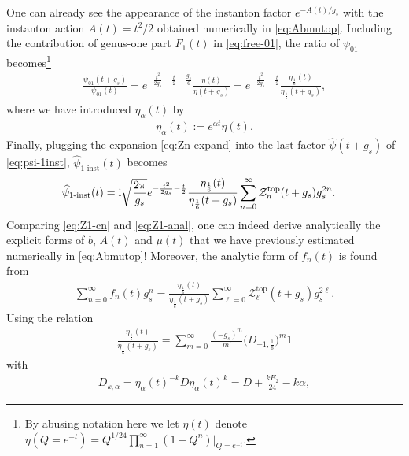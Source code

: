 \documentclass[11pt]{article}
\newcommand{\ri}{{\rm i}}
\def\h#1{\widehat{#1}}
\def\al{\alpha}
\def\rt#1{\sqrt{#1}}
\newcommand{\Ztop}{\mathcal{Z}^{\text{top}}}
\renewcommand{\[}{\begin{eqnarray}}
\renewcommand{\]}{\end{eqnarray}}
\newcommand{\Atop}{A}
\newcommand{\btop}{b}
\newcommand{\ftop}{f}
\newcommand{\mutop}{\mu}
\begin{document}
One can already see the appearance of the instanton factor
$e^{-A(t)/g_s}$ with the instanton action
$A(t)=t^2/2$ obtained numerically in \eqref{eq:Abmutop}. 
Including the contribution of genus-one part $F_1(t)$
in \eqref{eq:free-01}, the ratio of $\psi_{01}$
becomes\footnote{By abusing notation
here we let $\eta(t)$ denote
$\eta\left(Q=e^{-t}\right)
 =Q^{1/24}\prod_{n=1}^\infty(1-Q^n)\big|_{Q=e^{-t}}$.}
\begin{equation}
\begin{aligned}
 \frac{\psi_{01}(t+g_s)}{\psi_{01}(t)}=
e^{-\frac{t^2}{2g_s}-\frac{t}{2}-\frac{g_s}{6}}
\frac{\eta(t)}{\eta(t+g_s)}
=e^{-\frac{t^2}{2g_s}-\frac{t}{2}}
 \frac{\eta_{\frac{1}{6}}(t)}{\eta_{\frac{1}{6}}(t+g_s)},
\end{aligned} 
\end{equation}
where we have introduced $\eta_{\al}(t)$ by
\begin{align}
 \eta_{\al}(t):= e^{\al t}\eta(t).
\label{eq:eta-al}
\end{align}
Finally, plugging the expansion \eqref{eq:Zn-expand}
into the last factor $\h{\psi}(t+g_s)$ of \eqref{eq:psi-1inst},
$\h{\psi}_{\text{1-inst}}(t)$ becomes
\begin{align}
\begin{aligned}
 \h{\psi}_{\text{1-inst}}(t)
&=\ri\rt{\frac{2\pi}{g_s}}
  e^{-\frac{t^2}{2g_s}-\frac{t}{2}}
  \frac{\eta_{\frac{1}{6}}(t)}{\eta_{\frac{1}{6}}(t+g_s)}\sum_{n=0}^\infty 
\Ztop_n(t+g_s)g_s^{2n}.
\end{aligned}
\label{eq:Z1-anal}
\end{align}
Comparing \eqref{eq:Z1-cn} and \eqref{eq:Z1-anal},
one can indeed derive analytically the explicit forms of
$\btop$, $\Atop(t)$ and $\mutop(t)$
that we have previously estimated 
numerically in \eqref{eq:Abmutop}!
Moreover, the analytic form of $\ftop_n(t)$ is found from
%
\begin{align}
 \sum_{n=0}^\infty \ftop_n(t) g_s^n=\frac{\eta_{\frac{1}{6}}(t)}{\eta_{\frac{1}{6}}(t+g_s)}
\sum_{\ell=0}^\infty \Ztop_\ell(t+g_s)g_s^{2\ell}.
\end{align}
%
Using the relation
\begin{align}
 \frac{\eta_{\frac{1}{6}}(t)}{\eta_{\frac{1}{6}}(t+g_s)}
=\sum_{m=0}^\infty \frac{(-g_s)^m}{m!}\Big(D_{-1,\frac{1}{6}}\Big)^m 1
\end{align}
with
\begin{equation}
\begin{aligned}
D_{k,\al}=\eta_{\al}(t)^{-k}D\eta_{\al}(t)^{k}=
D+\frac{kE_2}{24}-k\al, 
\end{aligned} 
\label{eq:D-kal}
\end{equation}
\end{document}
